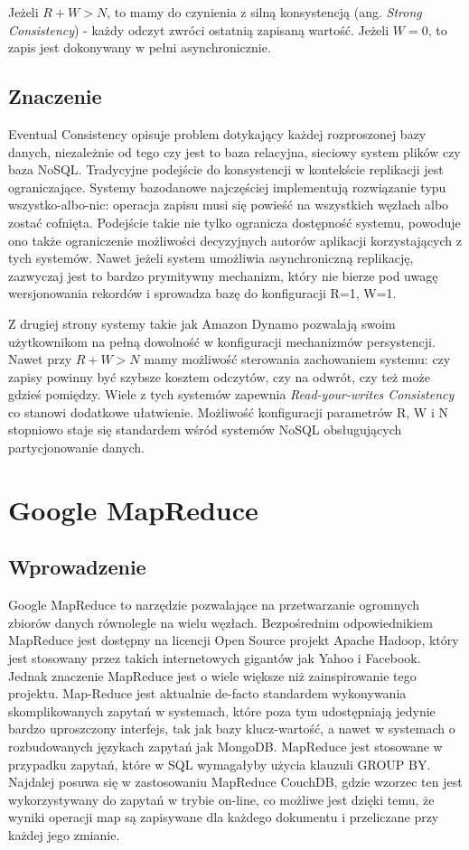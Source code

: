 Jeżeli $R+W>N$, to mamy do czynienia z silną konsystencją (ang. \emph{Strong Consistency}) - każdy odczyt zwróci ostatnią zapisaną wartość.
Jeżeli $W = 0$, to zapis jest dokonywany w pełni asynchronicznie.

\subsection*{Znaczenie}

Eventual Consistency opisuje problem dotykający każdej rozproszonej bazy danych, niezależnie od tego czy jest to baza relacyjna, sieciowy system plików czy baza NoSQL.
Tradycyjne podejście do konsystencji w kontekście replikacji jest ograniczające.
Systemy bazodanowe najczęściej implementują rozwiązanie typu wszystko-albo-nic: operacja zapisu musi się powieść na wszystkich węzłach albo zostać cofnięta.
Podejście takie nie tylko ogranicza dostępność systemu, powoduje ono także ograniczenie możliwości decyzyjnych autorów aplikacji korzystających z tych systemów.
Nawet jeżeli system umożliwia asynchroniczną replikację, zazwyczaj jest to bardzo prymitywny mechanizm, który nie bierze pod uwagę wersjonowania rekordów i sprowadza bazę do konfiguracji R=1, W=1.

Z drugiej strony systemy takie jak Amazon Dynamo pozwalają swoim użytkownikom na pełną dowolność w konfiguracji mechanizmów persystencji.
Nawet przy $R+W>N$ mamy możliwość sterowania zachowaniem systemu: czy zapisy powinny być szybsze kosztem odczytów, czy na odwrót, czy też może gdzieś pomiędzy.
Wiele z tych systemów zapewnia \emph{Read-your-writes Consistency} co stanowi dodatkowe ułatwienie.
Możliwość konfiguracji parametrów R, W i N stopniowo staje się standardem wśród systemów NoSQL obsługujących partycjonowanie danych.

\section{Google MapReduce}
\label{sec:google-map-reduce}

\subsection*{Wprowadzenie}

Google MapReduce to narzędzie pozwalające na przetwarzanie ogromnych zbiorów danych równolegle na wielu węzłach.
Bezpośrednim odpowiednikiem MapReduce jest dostępny na licencji Open Source projekt Apache Hadoop, który jest stosowany przez takich internetowych gigantów jak Yahoo i Facebook.
Jednak znaczenie MapReduce jest o wiele większe niż zainspirowanie tego projektu.
Map-Reduce jest aktualnie de-facto standardem wykonywania skomplikowanych zapytań w systemach, które poza tym udostępniają jedynie bardzo uproszczony interfejs, tak jak bazy klucz-wartość, a nawet w systemach o rozbudowanych językach zapytań jak MongoDB. 
MapReduce jest stosowane w przypadku zapytań, które w SQL wymagałyby użycia klauzuli GROUP BY.
Najdalej posuwa się w zastosowaniu MapReduce CouchDB, gdzie wzorzec ten jest wykorzystywany do zapytań w trybie on-line, co możliwe jest dzięki temu, że wyniki operacji map są zapisywane dla każdego dokumentu i przeliczane przy każdej jego zmianie. 

